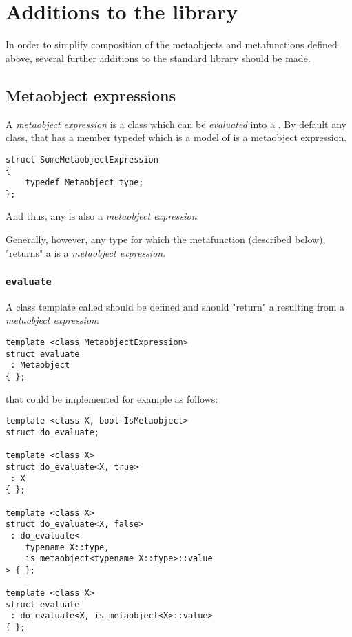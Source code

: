 \section{Additions to the library}
\label{section-Library}

In order to simplify composition of the metaobjects and metafunctions defined
\hyperref[section-Concepts]{above}, several further additions to the standard
library should be made.

\subsection{Metaobject expressions}

A {\em metaobject expression} is a class which can be {\em evaluated}
into a . By default any class, that has a member typedef
which is a model of  is a metaobject expression.

\begin{verbatim}
struct SomeMetaobjectExpression
{
	typedef Metaobject type;
};

\end{verbatim}

And thus, any  is also a {\em metaobject expression}.

Generally, however, any type for which the \verb@evaluate@ metafunction
(described below), "returns" a  is a {\em metaobject expression}.

\subsubsection{\texttt{evaluate}}

A class template called \verb@evaluate@ should be defined and should "return" a 
resulting from a {\em metaobject expression}:

\begin{verbatim}
template <class MetaobjectExpression>
struct evaluate
 : Metaobject
{ };
\end{verbatim}

that could be implemented for example as follows:

\begin{verbatim}
template <class X, bool IsMetaobject>
struct do_evaluate;

template <class X>
struct do_evaluate<X, true>
 : X
{ };

template <class X>
struct do_evaluate<X, false>
 : do_evaluate<
	typename X::type,
	is_metaobject<typename X::type>::value
> { };

template <class X>
struct evaluate
 : do_evaluate<X, is_metaobject<X>::value>
{ };

\end{verbatim}

